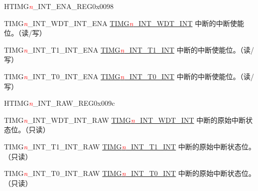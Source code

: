 \begin{register}{H}{TIMG\textcolor{red}{\it{n}}\_INT\_ENA\_REG}{0x0098}\label{regdesc:TIMERSINTENAREG}
%
%
%
%
\regnewline%
\begin{regdesc}\begin{reglist}
\item [TIMG\textcolor{red}{\it{n}}\_INT\_WDT\_INT\_ENA] \hyperref[int:TIMERSINTWDTINT]{TIMG\textcolor{red}{\it{n}}\_INT\_WDT\_INT} 中断的中断使能位。（读/写）
\item [TIMG\textcolor{red}{\it{n}}\_INT\_T1\_INT\_ENA] \hyperref[int:TIMERSINTT1INT]{TIMG\textcolor{red}{\it{n}}\_INT\_T1\_INT} 中断的中断使能位。（读/写）
\item [TIMG\textcolor{red}{\it{n}}\_INT\_T0\_INT\_ENA] \hyperref[int:TIMERSINTT0INT]{TIMG\textcolor{red}{\it{n}}\_INT\_T0\_INT} 中断的中断使能位。（读/写）
\end{reglist}\end{regdesc}
\end{register}


\begin{register}{H}{TIMG\textcolor{red}{\it{n}}\_INT\_RAW\_REG}{0x009c}\label{regdesc:TIMERSINTRAWREG}
%
%
%
%
\regnewline%
\begin{regdesc}\begin{reglist}
\item [TIMG\textcolor{red}{\it{n}}\_INT\_WDT\_INT\_RAW] \hyperref[int:TIMERSINTWDTINT]{TIMG\textcolor{red}{\it{n}}\_INT\_WDT\_INT} 中断的原始中断状态位。（只读）
\item [TIMG\textcolor{red}{\it{n}}\_INT\_T1\_INT\_RAW] \hyperref[int:TIMERSINTT1INT]{TIMG\textcolor{red}{\it{n}}\_INT\_T1\_INT} 中断的原始中断状态位。（只读）
\item [TIMG\textcolor{red}{\it{n}}\_INT\_T0\_INT\_RAW] \hyperref[int:TIMERSINTT0INT]{TIMG\textcolor{red}{\it{n}}\_INT\_T0\_INT} 中断的原始中断状态位。（只读）
\end{reglist}\end{regdesc}
\end{register}


